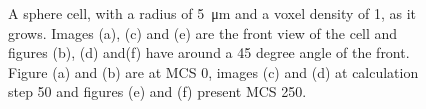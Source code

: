 \begin{figure}
\begin{center}
{	}
	\end{center}
	\caption{\label{img:GrowthSphereCellRadius5}A sphere cell, with a radius of \SI{5}{\micro\metre} and a voxel density of 1, as it grows. Images (a), (c) and (e) are the front view of the cell and figures (b), (d) and(f) have around a 45 degree angle of the front. Figure (a) and (b) are at \ac{MCS} 0, images (c) and (d) at calculation step 50 and figures (e) and (f) present \ac{MCS} 250.}
\end{figure}

